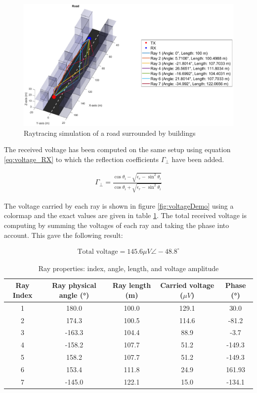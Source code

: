 \documentclass[10pt,a4paper]{ULBreport}
\begin{document}
\begin{figure}[H]
    \centering
    \includegraphics[width=1\textwidth]{3_1.eps}
    \caption{Raytracing simulation of a road surrounded by buildings}
    \label{fig:raytracingDemo}
\end{figure}

The received voltage has been computed on the same setup using equation \ref{eq:voltage_RX} to which the reflection coefficients $\Gamma_{\perp}$ have been added. 

\begin{align*}
    \Gamma_{\perp} = \frac{\cos \theta_i - \sqrt{\epsilon_r-\sin^2\theta_i}}{\cos \theta_i + \sqrt{\epsilon_r-\sin^2\theta_i}}
\end{align*}

The voltage carried by each ray is shown in figure \ref{fig:voltageDemo} using a colormap and the exact values are given in table \ref{tab:ray_properties}. The total received voltage is computing by summing the voltages of each ray and taking the phase into account. This gave the following result:

\begin{align*}
    \text{Total voltage} = 145.6 \mu V \angle -48.8^\circ
\end{align*}

\begin{table}[H]
    \centering
    \begin{tabular}{|c|c|c|c|c|}
        \hline
        Ray Index & Ray physical angle (°) & Ray length (m) & Carried voltage ($\mu V$) & Phase (°) \\ \hline
        1 & 180.0 & 100.0 & 129.1 & 30.0\\ \hline
        2 & 174.3 & 100.5 & 114.6 & -81.2\\ \hline
        3 & -163.3 & 104.4 & 88.9 & -3.7\\ \hline
        4 & -158.2 & 107.7 & 51.2 & -149.3\\ \hline
        5 & 158.2 & 107.7 & 51.2 & -149.3\\ \hline
        6 & 153.4 & 111.8 & 24.9 & 161.93\\ \hline
        7 & -145.0 & 122.1 & 15.0 & -134.1\\ \hline
    \end{tabular}
    \caption{Ray properties: index, angle, length, and voltage amplitude}
    \label{tab:ray_properties}
\end{table}
\end{document}
